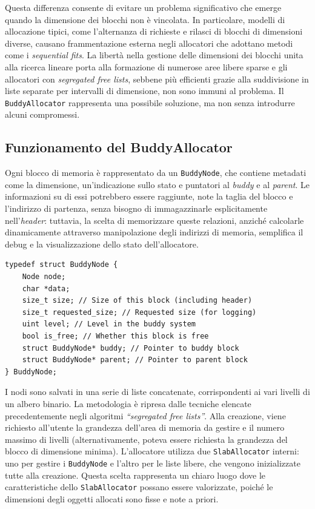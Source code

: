 Questa differenza consente di evitare un problema significativo che emerge quando la dimensione dei blocchi non è vincolata. In particolare, modelli di allocazione tipici, come l'alternanza di richieste e rilasci di blocchi di dimensioni diverse, causano frammentazione esterna negli allocatori che adottano metodi come i \textit{sequential fits}. La libertà nella gestione delle dimensioni dei blocchi unita alla ricerca lineare porta alla formazione di numerose aree libere sparse e gli allocatori con \textit{segregated free lists}, sebbene più efficienti grazie alla suddivisione in liste separate per intervalli di dimensione, non sono immuni al problema. Il \texttt{BuddyAllocator} rappresenta una possibile soluzione, ma non senza introdurre alcuni compromessi.

\subsection*{Funzionamento del BuddyAllocator}
Ogni blocco di memoria è rappresentato da un \texttt{BuddyNode}, che contiene metadati come la dimensione, un’indicazione sullo stato e puntatori al \textit{buddy} e al \textit{parent}. Le informazioni su di essi potrebbero essere raggiunte, note la taglia del blocco e l’indirizzo di partenza, senza bisogno di immagazzinarle esplicitamente nell’\textit{header}: tuttavia, la scelta di memorizzare queste relazioni, anziché calcolarle dinamicamente attraverso manipolazione degli indirizzi di memoria, semplifica il debug e la visualizzazione dello stato dell'allocatore.

\begin{lstlisting}
typedef struct BuddyNode {
    Node node;
    char *data;
    size_t size; // Size of this block (including header)
    size_t requested_size; // Requested size (for logging)
    uint level; // Level in the buddy system
    bool is_free; // Whether this block is free
    struct BuddyNode* buddy; // Pointer to buddy block
    struct BuddyNode* parent; // Pointer to parent block
} BuddyNode;
\end{lstlisting}

I nodi sono salvati in una serie di liste concatenate, corrispondenti ai vari livelli di un albero binario. La metodologia è ripresa dalle tecniche elencate precedentemente negli algoritmi \textit{“segregated free lists”}. Alla creazione, viene richiesto all’utente la grandezza dell’area di memoria da gestire e il numero massimo di livelli (alternativamente, poteva essere richiesta la grandezza del blocco di dimensione minima). L'allocatore utilizza due \texttt{SlabAllocator} interni: uno per gestire i \texttt{BuddyNode} e l'altro per le liste libere, che vengono inizializzate tutte alla creazione. Questa scelta rappresenta un chiaro luogo dove le caratteristiche dello \texttt{SlabAllocator} possano essere valorizzate, poiché le dimensioni degli oggetti allocati sono fisse e note a priori.

